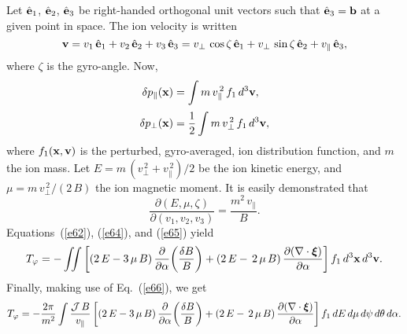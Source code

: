 \documentclass[12pt,prb,aps,notitlepage]{revtex4-1}
\newcommand{\bxi}{\mbox{\boldmath$\xi$}}
\begin{document}
 Let $\hat{\bf e}_1$, $\hat{\bf e}_2$, $\hat{\bf e}_3$ be right-handed orthogonal unit vectors such that $\hat{\bf e}_3={\bf b}$ at a given
 point in space. The ion velocity is written
 \begin{equation}
 {\bf v} = v_1\,\hat{\bf e}_1 + v_2\,\hat{\bf e}_2+v_3\,\hat{\bf e}_3= v_\perp\,\cos\zeta\,\hat{\bf e}_1+ v_\perp\,\sin\zeta\,\hat{\bf e}_2+ 
 v_\parallel\,\hat{\bf e}_3,
 \end{equation}
 where $\zeta$ is the gyro-angle. 
 Now, 
 \begin{align}\label{e64}
 \delta p_\parallel({\bf x}) &= \int m\,v_\parallel^{\,2}\,f_1\,d^3{\bf v},\\[0.5ex]
 \delta p_\perp({\bf x}) &= \frac{1}{2}\int m\,v_\perp^{\,2}\,f_1\,d^3{\bf v},\label{e65}
 \end{align}
 where $f_1({\bf x},{\bf v})$ is the perturbed, gyro-averaged, ion distribution function, and $m$  the ion mass. Let
 $E=m\,(v_\perp^{\,2}+v_\parallel^{\,2})/2$ be the ion kinetic energy,  and $\mu=m\,v_\perp^{\,2}/(2\,B)$ the ion magnetic moment. 
 It is easily demonstrated that
 \begin{equation}\label{e66}
 \frac{\partial (E,\mu,\zeta)}{\partial(v_1,v_2,v_3)} = \frac{m^2\,v_\parallel}{B}.
 \end{equation}
 Equations~(\ref{e62}), (\ref{e64}), and (\ref{e65}) yield
 \begin{equation}
 T_\varphi =-\int\!\!\!\int \left[(2\,E-3\,\mu\,B)\,\frac{\partial}{\partial\alpha}\!\left(\frac{\delta B}{B}\right) + (2\,E-\,2\,\mu\,B)\,\frac{\partial(\nabla\cdot\bxi)}{\partial\alpha}\right]f_1\,d^3{\bf x}\,d^3{\bf v}.
 \end{equation}
 Finally, making use of Eq.~(\ref{e66}), we get
 \begin{equation}\label{e92x}
 T_\varphi = -\frac{2\pi}{m^2}\int \frac{{\cal J}\,B}{v_\parallel}\left[(2\,E-3\,\mu\,B)\,\frac{\partial}{\partial\alpha}\!\left(\frac{\delta B}{B}\right) + (2\,E-\,2\,\mu\,B)\,\frac{\partial(\nabla\cdot\bxi)}{\partial\alpha}\right]f_1\,dE\,d\mu\,d\psi\,d\theta\,d\alpha.
 \end{equation}
 
\end{document}
